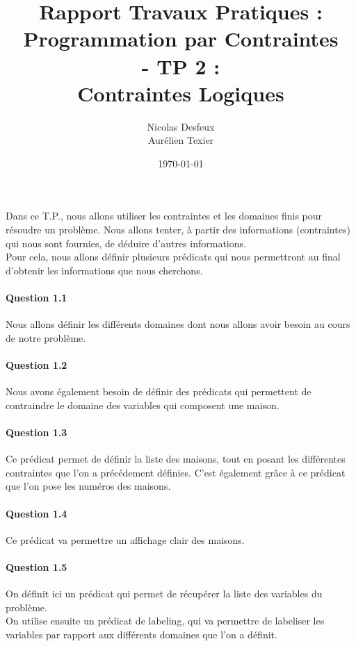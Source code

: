 \documentclass[11pt]{article} %
\date{\today}
\title{Rapport Travaux Pratiques : \\Programmation par Contraintes\\ - TP 2 : \\\textbf{Contraintes Logiques}}
\author{Nicolas Desfeux\\Aurélien Texier}
\begin{document}
\lstset{language=Prolog,breaklines=true,numbers=left,basicstyle=\footnotesize ,numberstyle=\footnotesize}
\maketitle
\paragraph{} Dans ce T.P., nous allons utiliser les contraintes et les domaines finis pour résoudre un problème. Nous allons tenter, à partir des informations (contraintes) qui nous sont fournies, de déduire d'autres informations.\\
Pour cela, nous allons définir plusieurs prédicats qui nous permettront au final d'obtenir les informations que nous cherchons.

\paragraph{Question 1.1}
Nous allons définir les différents domaines dont nous allons avoir besoin au cours de notre problème.


\paragraph{Question 1.2}
Nous avons également besoin de définir des prédicats qui permettent de contraindre le domaine des variables qui composent une maison.


\paragraph{Question 1.3}
Ce prédicat permet de définir la liste des maisons, tout en posant les différentes contraintes que l'on a précédement définies. C'est également grâce à ce prédicat que l'on pose les numéros des maisons.


\paragraph{Question 1.4}
Ce prédicat va permettre un affichage clair des maisons.


\paragraph{Question 1.5}
On définit ici un prédicat qui permet de récupérer la liste des variables du problème.\\
On utilise ensuite un prédicat de labeling, qui va permettre de labeliser les variables par rapport aux différents domaines que l'on a définit.

\end{document}
